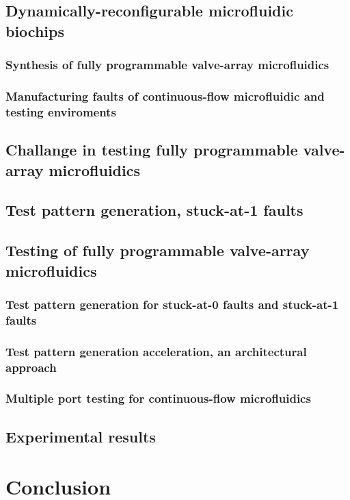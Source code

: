 \documentclass{article}
\begin{document}
\subsection{Dynamically-reconfigurable microfluidic biochips}
  \subsubsection{Synthesis of fully programmable valve-array microfluidics} 
  \subsubsection{Manufacturing faults  of continuous-flow microfluidic and testing enviroments}  
  \subsection{Challange in testing fully programmable valve-array microfluidics}
\subsection{Test pattern generation, stuck-at-1 faults}

\subsection{Testing of fully programmable valve-array microfluidics}
  \subsubsection{Test pattern generation for stuck-at-0 faults and stuck-at-1 faults}
  \subsubsection{Test pattern generation acceleration, an architectural approach}
  \subsubsection{Multiple port testing for continuous-flow microfluidics}

\subsection{Experimental results}


\section{Conclusion}
\end{document}
